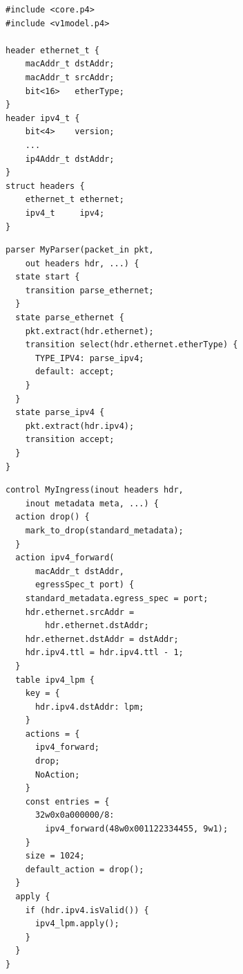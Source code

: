 \documentclass[aspectratio=169]{beamer}
\begin{document}
\newsavebox{\pfourheaders}
\begin{lrbox}{\pfourheaders}
\begin{minipage}{0.46\textwidth}
\begin{lstlisting}[style=p4style]
#include <core.p4>
#include <v1model.p4>

header ethernet_t {
    macAddr_t dstAddr;
    macAddr_t srcAddr;
    bit<16>   etherType;
}
header ipv4_t {
    bit<4>    version;
    ...
    ip4Addr_t dstAddr;
}
struct headers {
    ethernet_t ethernet;
    ipv4_t     ipv4;
}
\end{lstlisting}
\end{minipage}
\end{lrbox}

\newsavebox{\pfourparser}
\begin{lrbox}{\pfourparser}
\begin{minipage}{0.46\textwidth}
\begin{lstlisting}[style=p4style]
parser MyParser(packet_in pkt,
    out headers hdr, ...) {
  state start {
    transition parse_ethernet;
  }
  state parse_ethernet {
    pkt.extract(hdr.ethernet);
    transition select(hdr.ethernet.etherType) {
      TYPE_IPV4: parse_ipv4;
      default: accept;
    }
  }
  state parse_ipv4 {
    pkt.extract(hdr.ipv4);
    transition accept;
  }
}
\end{lstlisting}
\end{minipage}
\end{lrbox}

\newsavebox{\pfourcontrol}
\begin{lrbox}{\pfourcontrol}
\begin{minipage}{0.46\textwidth}
\begin{lstlisting}[style=p4style]
control MyIngress(inout headers hdr,
    inout metadata meta, ...) {
  action drop() {
    mark_to_drop(standard_metadata);
  }
  action ipv4_forward(
      macAddr_t dstAddr,
      egressSpec_t port) {
    standard_metadata.egress_spec = port;
    hdr.ethernet.srcAddr =
        hdr.ethernet.dstAddr;
    hdr.ethernet.dstAddr = dstAddr;
    hdr.ipv4.ttl = hdr.ipv4.ttl - 1;
  }
  table ipv4_lpm {
    key = {
      hdr.ipv4.dstAddr: lpm;
    }
    actions = {
      ipv4_forward;
      drop;
      NoAction;
    }
    const entries = {
      32w0x0a000000/8:
        ipv4_forward(48w0x001122334455, 9w1);
    }
    size = 1024;
    default_action = drop();
  }
  apply {
    if (hdr.ipv4.isValid()) {
      ipv4_lpm.apply();
    }
  }
}
\end{lstlisting}
\end{minipage}
\end{lrbox}
\end{document}
